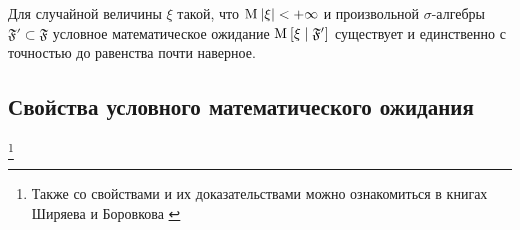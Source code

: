 \begin{theorem}
  Для случайной величины $\xi$ такой, что $\operatorname{M}_{} \left| \xi \right| < +\infty$
  и произвольной $\sigma$-алгебры $\mathfrak{F}' \subset \mathfrak{F}$ условное
  математическое ожидание $\operatorname{M}_{} \left[ \xi \;\middle|\; \mathfrak{F}' \right]$ существует и
  единственно с точностью до равенства почти наверное.
  \cite[стр.~142]{BorovkovMS}
\end{theorem}

\subsection{Свойства условного математического ожидания}
\footnote{Также
со свойствами и их доказательствами можно ознакомиться в книгах
Ширяева \cite[стр.~270]{Shiryayev1} и Боровкова \cite[стр.~143]{BorovkovMS}
}

